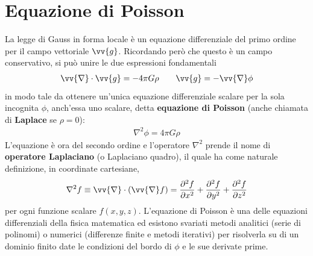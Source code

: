 \documentclass[a4paper, oneside]{book}
\begin{document}
\section{Equazione di Poisson}
La legge di Gauss in forma locale è un equazione differenziale del primo ordine per il 
campo vettoriale $\vv{g}$. Ricordando però che questo è un campo conservativo, si può 
unire le due espressioni fondamentali
\begin{gather*}
    \vv{\nabla} \cdot \vv{g} = -4\pi G \rho \qquad \vv{g} = -\vv{\nabla}\phi    
\end{gather*}
in modo tale da ottenere un'unica equazione differenziale scalare per la sola incognita $\phi$, 
anch'essa uno scalare, detta \textbf{equazione di Poisson} (anche 
chiamata di \textbf{Laplace} se $\rho = 0$):
\begin{align}
    \boxed{\nabla^{2}\phi = 4\pi G \rho}
\end{align}
L'equazione è ora del secondo ordine e l'operatore $\nabla^{2}$ prende il nome di
\textbf{operatore Laplaciano} (o Laplaciano quadro), il quale ha come naturale
definizione, in coordinate cartesiane, 
\begin{align}
    \nabla^{2}f \equiv \vv{\nabla} \cdot (\vv{\nabla}f ) = \frac{\partial^{2} f}{\partial x^{2} } + \frac{\partial ^{2} f}{\partial y^{2}} + \frac{\partial ^{2} f}{\partial z^{2}}   
\end{align}
per ogni funzione scalare $f(x, y, z)$. L'equazione di Poisson è una delle equazioni differenziali della fisica matematica ed 
esistono svariati metodi analitici (serie di polinomi) o numerici (differenze finite e metodi iterativi)
per risolverla su di un dominio finito date le condizioni del bordo di $\phi$ 
e le sue derivate prime.
\end{document}
